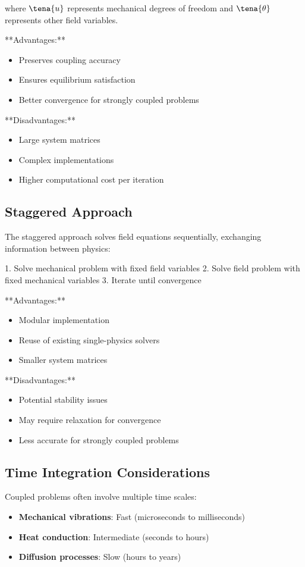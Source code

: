 where $\tena{u}$ represents mechanical degrees of freedom and $\tena{\theta}$ represents other field variables.

**Advantages:**
\begin{itemize}
\item Preserves coupling accuracy
\item Ensures equilibrium satisfaction
\item Better convergence for strongly coupled problems
\end{itemize}

**Disadvantages:**
\begin{itemize}
\item Large system matrices
\item Complex implementations
\item Higher computational cost per iteration
\end{itemize}

\subsection{Staggered Approach}

The staggered approach solves field equations sequentially, exchanging information between physics:

1. Solve mechanical problem with fixed field variables
2. Solve field problem with fixed mechanical variables
3. Iterate until convergence

**Advantages:**
\begin{itemize}
\item Modular implementation
\item Reuse of existing single-physics solvers
\item Smaller system matrices
\end{itemize}

**Disadvantages:**
\begin{itemize}
\item Potential stability issues
\item May require relaxation for convergence
\item Less accurate for strongly coupled problems
\end{itemize}

\subsection{Time Integration Considerations}

Coupled problems often involve multiple time scales:
\begin{itemize}
\item \textbf{Mechanical vibrations}: Fast (microseconds to milliseconds)
\item \textbf{Heat conduction}: Intermediate (seconds to hours)
\item \textbf{Diffusion processes}: Slow (hours to years)
\end{itemize}

